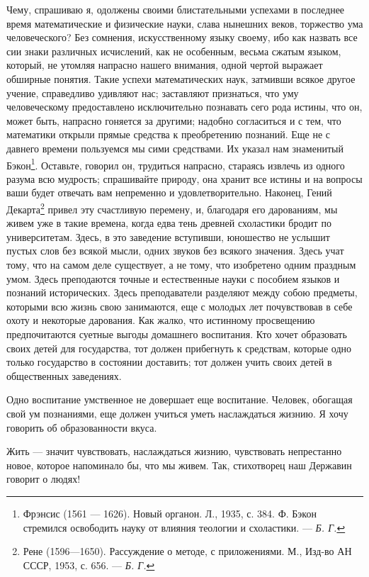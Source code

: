 \documentclass[12pt, a4paper, openany]{book}
\begin{document}
Чему, спрашиваю я, одолжены своими  блистательными успехами в последнее время математические и физические науки, слава нынешних веков, торжество ума  человеческого? Без сомнения, искусственному языку своему, ибо как назвать все сии знаки различных исчислений, как не особенным, весьма сжатым языком, который, не утомляя напрасно нашего внимания, одной чертой выражает  обширные понятия. Такие успехи математических наук,  затмивши всякое другое учение, справедливо удивляют нас; заставляют признаться, что уму человеческому  предоставлено исключительно познавать сего рода истины, что он, может быть, напрасно гоняется за другими; надобно  согласиться и с тем, что математики открыли прямые средства к преобретению познаний. Еще не с давнего времени  пользуемся мы сими средствами. Их указал нам знаменитый Бэкон{\footnote{ Фрэнсис (1561 — 1626). Новый органон. Л., 1935, с. 384. Ф. Бэкон стремился освободить науку от влияния теологии и схоластики. — \textit{Б. Г.}}}. Оставьте, говорил он, трудиться напрасно,  стараясь извлечь из одного разума всю мудрость; спрашивайте природу, она хранит все истины и на вопросы ваши будет отвечать вам непременно и удовлетворительно. Наконец, Гений Декарта{\footnote{ Рене (1596—1650). Рассуждение о методе, с  приложениями. М., Изд-во АН СССР, 1953, с. 656. — \textit{Б. Г.}}} привел эту счастливую перемену, и,  благодаря его дарованиям, мы живем уже в такие времена, когда едва тень древней схоластики бродит по  университетам. Здесь, в это заведение вступивши, юношество не услышит пустых слов без всякой мысли, одних звуков без всякого значения. Здесь учат тому, что на самом деле  существует, а не тому, что изобретено одним праздным умом. Здесь преподаются точные и естественные науки с пособием языков и познаний исторических. Здесь преподаватели  разделяют между собою предметы, которыми всю жизнь свою занимаются, еще с молодых лет почувствовав в себе охоту и некоторые дарования. Как жалко, что истинному  просвещению предпочитаются суетные выгоды домашнего  воспитания. Кто хочет образовать своих детей для государства, тот должен прибегнуть к средствам, которые одно только государство в состоянии доставить; тот должен учить своих детей в общественных заведениях. 

Одно воспитание умственное не довершает еще  воспитание. Человек, обогащая свой ум познаниями, еще должен учиться уметь наслаждаться жизнию. Я хочу говорить об образованности вкуса. 

Жить — значит чувствовать, наслаждаться жизнию, чувствовать непрестанно новое, которое напоминало бы, что мы живем. Так, стихотворец наш Державин говорит о людях! 
\end{document}
